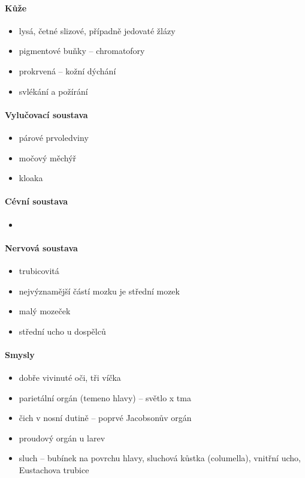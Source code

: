 \paragraph{Kůže}
\begin{itemize}
\item lysá, četné slizové, případně jedovaté žlázy
\item pigmentové buňky -- chromatofory
\item prokrvená -- kožní dýchání
\item svlékání a požírání
\end{itemize}

\paragraph{Vylučovací soustava}
\begin{itemize}
\item párové prvoledviny
\item močový měchýř
\item kloaka
\end{itemize}

\paragraph{Cévní soustava}
\begin{itemize}
\item 
\end{itemize}

\paragraph{Nervová soustava}
\begin{itemize}
\item trubicovitá
\item nejvýznamější částí mozku je střední mozek
\item malý mozeček
\item střední ucho u dospělců
\end{itemize}

\paragraph{Smysly}
\begin{itemize}
\item dobře vivinuté oči, tři víčka
\item parietální orgán (temeno hlavy) -- světlo x tma
\item čich v nosní dutině -- poprvé Jacobsonův orgán
\item proudový orgán u larev
\item sluch -- bubínek na povrchu hlavy, sluchová kůstka (columella), vnitřní ucho, Eustachova trubice
\end{itemize}

